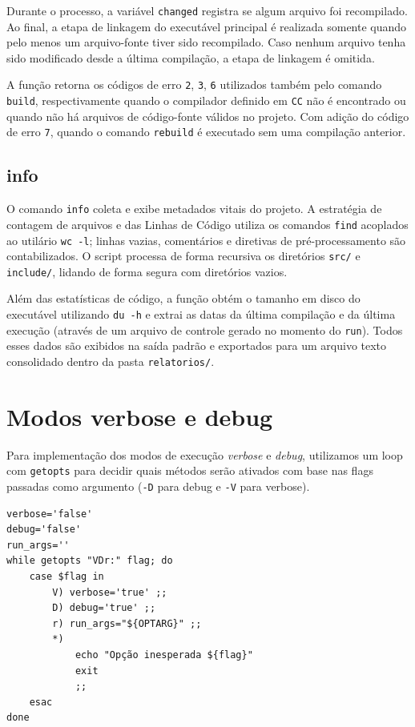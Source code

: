 \documentclass[a4paper]{article}
\begin{document}
Durante o processo, a variável \texttt{changed} registra se algum arquivo
foi recompilado. Ao final, a etapa de linkagem do executável principal é
realizada somente quando pelo menos um arquivo-fonte tiver sido
recompilado. Caso nenhum arquivo tenha sido modificado desde a última
compilação, a etapa de linkagem é omitida.

A função retorna os códigos de erro \texttt{2}, \texttt{3}, \texttt{6} utilizados também pelo comando \texttt{build}, respectivamente quando o compilador definido em \texttt{CC} não é encontrado ou quando não há arquivos de código-fonte válidos no projeto. Com adição do código de erro \texttt{7}, quando o comando \texttt{rebuild} é executado sem uma compilação anterior.

\subsection{info}
O comando \texttt{info} coleta e exibe metadados vitais do projeto. A estratégia de contagem de arquivos e das Linhas de Código utiliza os comandos \texttt{find} acoplados ao utilário \texttt{wc -l}; linhas vazias, comentários e diretivas de pré-processamento são contabilizados. O script processa de forma recursiva os diretórios \texttt{src/} e \texttt{include/}, lidando de forma segura com diretórios vazios. 

Além das estatísticas de código, a função obtém o tamanho em disco do executável utilizando \texttt{du -h} e extrai as datas da última compilação e da última execução (através de um arquivo de controle gerado no momento do \texttt{run}). Todos esses dados são exibidos na saída padrão e exportados para um arquivo texto consolidado dentro da pasta \texttt{relatorios/}.

\section{Modos verbose e debug}

Para implementação dos modos de execução \textit{verbose} e \textit{debug}, utilizamos um loop com \texttt{getopts} para decidir quais métodos serão ativados com base nas flags passadas como argumento (\texttt{-D} para debug e \texttt{-V} para verbose).

\begin{verbatim}
verbose='false'
debug='false'
run_args=''
while getopts "VDr:" flag; do
    case $flag in
        V) verbose='true' ;;
        D) debug='true' ;;
        r) run_args="${OPTARG}" ;;
        *)
            echo "Opção inesperada ${flag}"
            exit
            ;;
    esac
done
\end{verbatim}
\end{document}

